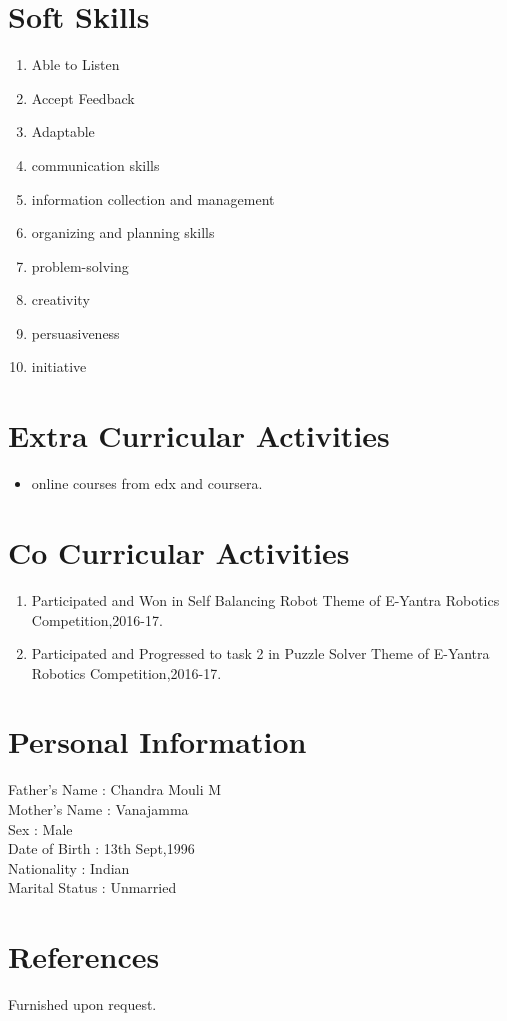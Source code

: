 \documentclass[margin,line]{res}
\begin{document}
\begin{resume}
\section{\sc Soft Skills}


\begin{enumerate}
	\item Able to Listen
	\item Accept Feedback
	\item Adaptable
	\item communication skills
	\item information collection and management
	\item organizing and planning skills
	\item problem-solving
	\item creativity
	\item persuasiveness
	\item initiative		    
\end{enumerate}

\section{\sc Extra Curricular Activities}
\begin{itemize}
	\item online courses from edx and coursera.
\end{itemize}

\section{\sc Co Curricular Activities}
\begin{enumerate}
	\item Participated and Won in Self Balancing Robot Theme of E-Yantra Robotics Competition,2016-17.
	\item Participated and Progressed to task 2 in Puzzle Solver Theme of E-Yantra Robotics Competition,2016-17.	    
\end{enumerate}

\section{\sc Personal Information}
Father's Name : Chandra Mouli M\\
Mother's Name : Vanajamma\\
Sex : Male\\
Date of Birth : 13th Sept,1996\\
Nationality : Indian\\
Marital Status : Unmarried\\

\section{\sc References}
Furnished upon request.\\



\end{resume}
\end{document}
